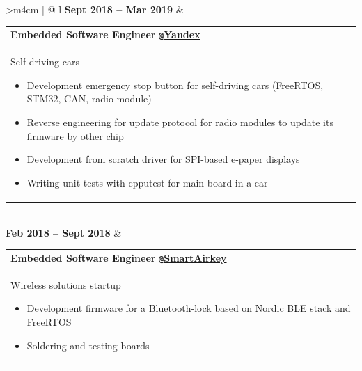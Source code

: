 \documentclass{anisyan-resume}
\begin{document}
\begin{tabularx}{\textwidth}{>{\quad}m{4cm} | @{\timelinebullet} l}
		\normalsize\textbf{Sept 2018 -- Mar 2019}
		&
		\renewcommand\arraystretch{1}
		\begin{tabular}[t]{ p{15cm} }
			\large{\textbf{Embedded Software Engineer}} \texttt{\textbf{@}}\href{https://en.wikipedia.org/wiki/Yandex}{\textbf{Yandex}}\\
			\normalsize{Self-driving cars}
			\renewcommand\labelitemi{{\boldmath$\cdot$}}
			\begin{itemize}[noitemsep, topsep=5pt, parsep=0pt, partopsep=0pt]
				\item {\small Development emergency stop button for self-driving cars (FreeRTOS, STM32, CAN, radio module)}
				\item {\small Reverse engineering for update protocol for radio modules to update its firmware by other chip}
				\item {\small Development from scratch driver for SPI-based e-paper displays}
				\item {\small Writing unit-tests with cpputest for main board in a car}
			\end{itemize}
		\end{tabular} \\

		\normalsize\textbf{Feb 2018 -- Sept 2018}
		&
		\renewcommand\arraystretch{1}
		\begin{tabular}[t]{ p{15cm} }
			\large{\textbf{Embedded Software Engineer}} \texttt{\textbf{@}}\href{https://smartairkey.com/en/}{\textbf{SmartAirkey}}\\
			\normalsize{Wireless solutions startup}
			\renewcommand\labelitemi{{\boldmath$\cdot$}}
			\begin{itemize}[noitemsep, topsep=5pt, parsep=0pt, partopsep=0pt]
				\item {\small Development firmware for a Bluetooth-lock based on Nordic BLE stack and FreeRTOS}
				\item {\small Soldering and testing boards}
			\end{itemize}
		\end{tabular} \\


\end{tabularx}
\end{document}
